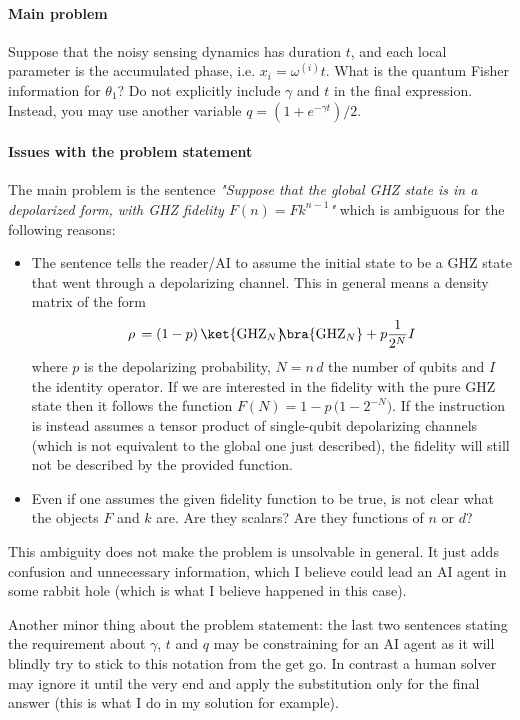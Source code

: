 \paragraph*{Main problem}

Suppose that the noisy sensing dynamics has duration $t$, and each local parameter is the accumulated phase, i.e. $x_i = \omega^{(i)} t$. What is the quantum Fisher information for $\theta_1$? Do not explicitly include $\gamma$ and $t$ in the final expression. Instead, you may use another variable $q = (1 + e^{-\gamma t}) / 2$.

{
\color{blue}
\paragraph*{Issues with the problem statement}

The main problem is the sentence \emph{"Suppose that the global GHZ state is in a depolarized form, with GHZ fidelity $F(n)=Fk^{n-1}$"} which is ambiguous for the following reasons:
\begin{itemize}
  \item The sentence tells the reader/AI to assume the initial state to be a GHZ state that went through a depolarizing channel. This in general means a density matrix of the form
  \begin{equation} \label{eq:depol_state}
      \rho\, = (1-p)\,\ket{\mathrm{GHZ}_N}\!\!\bra{\mathrm{GHZ}_N} + p \frac{1}{2^N} I
  \end{equation}
  where $p$ is the depolarizing probability, $N=n\,d$ the number of qubits and $I$ the identity operator. If we are interested in the fidelity with the pure GHZ state then it follows the function ${F(N)=1-p\,\big(1-2^{-N}\big)}$. If the instruction is instead assumes a tensor product of single-qubit depolarizing channels (which is not equivalent to the global one just described), the fidelity will still not be described by the provided function.

  \item Even if one assumes the given fidelity function to be true, is not clear what the objects $F$ and $k$ are. Are they scalars? Are they functions of $n$ or $d$?  
\end{itemize}
This ambiguity does not make the problem is unsolvable in general. It just adds confusion and unnecessary information, which I believe could lead an AI agent in some rabbit hole (which is what I believe happened in this case).

Another minor thing about the problem statement: the last two sentences stating the requirement about $\gamma$, $t$ and $q$ may be constraining for an AI agent as it will blindly try to stick to this notation from the get go. In contrast a human solver may ignore it until the very end and apply the substitution only for the final answer (this is what I do in my solution for example).

}
